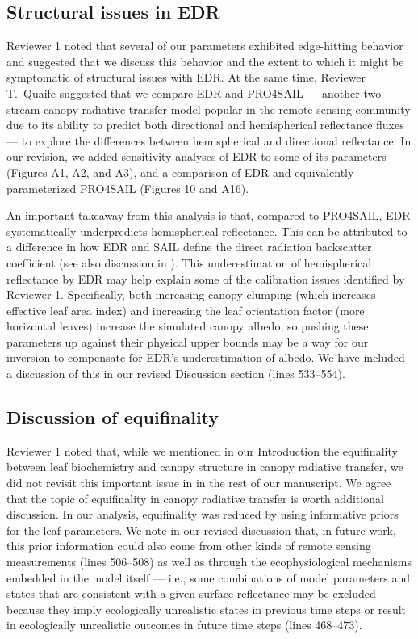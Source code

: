 \documentclass{article}
\begin{document}
\subsection{Structural issues in EDR}\label{subsec:structural}

Reviewer 1 noted that several of our parameters exhibited edge-hitting behavior and suggested that we discuss this behavior and the extent to which it might be symptomatic of structural issues with EDR.\@
At the same time, Reviewer T.\ Quaife suggested that we compare EDR and PRO4SAIL --- another two-stream canopy radiative transfer model popular in the remote sensing community due to its ability to predict both directional and hemispherical reflectance fluxes --- to explore the differences between hemispherical and directional reflectance.
In our revision, we added sensitivity analyses of EDR to some of its parameters (Figures A1, A2, and A3), and a comparison of EDR and equivalently parameterized PRO4SAIL (Figures 10 and A16).

An important takeaway from this analysis is that, compared to PRO4SAIL, EDR systematically underpredicts hemispherical reflectance.
This can be attributed to a difference in how EDR and SAIL define the direct radiation backscatter coefficient (see also discussion in \citealt{yuan2017reexamination}).
This underestimation of hemispherical reflectance by EDR may help explain some of the calibration issues identified by Reviewer 1.
Specifically, both increasing canopy clumping (which increases effective leaf area index) and increasing the leaf orientation factor (more horizontal leaves) increase the simulated canopy albedo,
so pushing these parameters up against their physical upper bounds may be a way for our inversion to compensate for EDR's underestimation of albedo.
We have included a discussion of this in our revised Discussion section (lines 533--554).

\subsection{Discussion of equifinality}\label{subsec:equifinality}

Reviewer 1 noted that, while we mentioned in our Introduction the equifinality between leaf biochemistry and canopy structure in canopy radiative transfer, we did not revisit this important issue in in the rest of our manuscript.
We agree that the topic of equifinality in canopy radiative transfer is worth additional discussion.
In our analysis, equifinality was reduced by using informative priors for the leaf parameters.
We note in our revised discussion that, in future work, this prior information could also come from other kinds of remote sensing measurements (lines 506--508)
as well as through the ecophysiological mechanisms embedded in the model itself --- i.e., some combinations of model parameters and states that are consistent with a given surface reflectance may be excluded because they imply ecologically unrealistic states in previous time steps or result in ecologically unrealistic outcomes in future time steps (lines 468--473).
\end{document}
